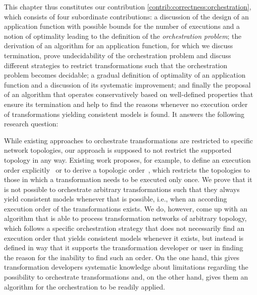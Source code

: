 This chapter thus constitutes our contribution \autoref{contrib:correctness:orchestration}, which consists of four subordinate contributions:
a discussion of the design of an application function with possible bounds for the number of executions and a notion of optimality leading to the definition of the \emph{orchestration problem}; the derivation of an algorithm for an application function, for which we discuss termination, prove undecidability of the orchestration problem and discuss different strategies to restrict transformations such that the orchestration problem becomes decidable; a gradual definition of optimality of an application function and a discussion of its systematic improvement; and finally the proposal of an algorithm that operates conservatively based on well-defined properties that ensure its termination and help to find the reasons whenever no execution order of transformations yielding consistent models is found.
It answers the following research question:


While existing approaches to orchestrate transformations are restricted to specific network topologies, our approach is supposed to not restrict the supported topology in any way.
Existing work proposes, for example, to define an execution order explicitly~\cite{pilgrim2008a, vanhooff2007UniTI-MODELS} or to derive a topologic order~\cite{stevens2020BidirectionalTransformationLarge-SoSym}, which restricts the topologies to those in which a transformation needs to be executed only once.
We prove that it is not possible to orchestrate arbitrary transformations such that they always yield consistent models whenever that is possible, i.e., when an according execution order of the transformations exists.
We do, however, come up with an algorithm that is able to process transformation networks of arbitrary topology, which follows a specific orchestration strategy that does not necessarily find an execution order that yields consistent models whenever it exists, but instead is defined in way that it supports the transformation developer or user in finding the reason for the inability to find such an order.
On the one hand, this gives transformation developers systematic knowledge about limitations regarding the possibility to orchestrate transformations and, on the other hand, gives them an algorithm for the orchestration to be readily applied.

